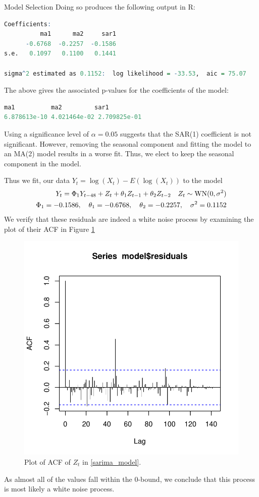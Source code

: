 \begin{subsection}{Model Selection}
  Doing so produces the following output in R:
  \begin{lstlisting}[language=R]
Coefficients:
          ma1      ma2     sar1
      -0.6768  -0.2257  -0.1586
s.e.   0.1097   0.1100   0.1441

sigma^2 estimated as 0.1152:  log likelihood = -33.53,  aic = 75.07
  \end{lstlisting}
  The above gives the associated p-values for the coefficients of the model:
  \begin{lstlisting}[language=R]
      ma1          ma2         sar1
6.878613e-10 4.021464e-02 2.709825e-01
  \end{lstlisting}
  Using a significance level of $\alpha=0.05$ suggests that the SAR(1) coefficient
  is not significant. However, removing the seasonal component and fitting the model
  to an MA(2) model results in a worse fit. Thus, we elect to keep the seasonal
  component in the model.

  Thus we fit, our data $Y_t = \log(X_t) - E(\log(X_t))$ to the model
  \begin{align}\label{sarima_model}
    Y_t = \Phi_1Y_{t-48} + Z_t + \theta_1Z_{t-1} + \theta_2Z_{t-2} \quad Z_t \sim \text{WN}(0, \sigma^2) \notag\\
    \Phi_1 = -0.1586, \quad \theta_1 = -0.6768, \quad \theta_2 = -0.2257, \quad \sigma^2 = 0.1152
  \end{align}
  We verify that these residuals are indeed
  a white noise process by examining the plot of their ACF in Figure \ref{res_acf}

  \begin{figure}[!h]
    \centerline{\includegraphics[scale=0.75]{../analysis/plots/res_acf}}
    \caption{Plot of ACF of $Z_t$ in \eqref{sarima_model}.}\label{res_acf}
  \end{figure}

  As almost all of the values fall within the 0-bound, we conclude that this
  process is most likely a white noise process.

\end{subsection}